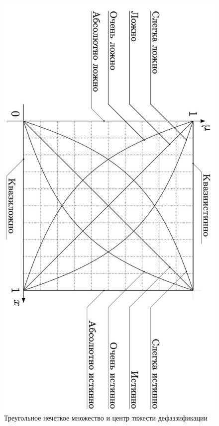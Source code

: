 \begin{figure}[h]
  \centering
  \includegraphics[width=\textwidth]{images/нечеткая истинность.png}
  \caption{Треугольное нечеткое множество и центр тяжести дефаззификации}
  \label{fig:centroid_defuzz}
\end{figure}

